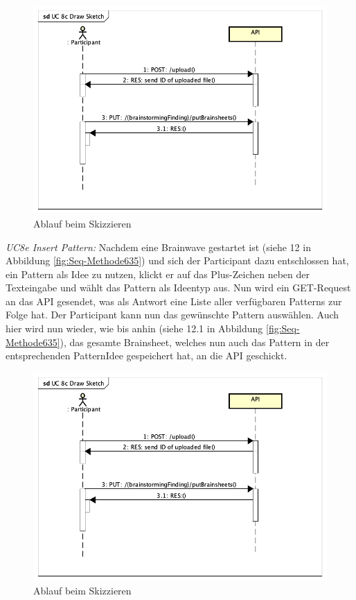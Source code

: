 \begin{figure}[h]
	\centering
	\includegraphics[width=1\linewidth]{img/anforderungen/Seq-Draw-Sketch}
	\caption[Ablauf beim Skizzieren]{Ablauf beim Skizzieren}
	\label{fig:Seq-Draw-Sketch}
\end{figure}

\begin{basedescript}{
		\desclabelstyle{\multilinelabel}
		\desclabelwidth{4.5cm}
		\setlength{\itemsep}{5ex}}	
	\item[\textit{UC8e Insert Pattern:}] Nachdem eine Brainwave gestartet ist (siehe 12 in Abbildung \ref{fig:Seq-Methode635}) und sich der Participant dazu entschlossen hat, ein Pattern als Idee zu nutzen, klickt er auf das Plus-Zeichen neben der Texteingabe und wählt das Pattern als Ideentyp aus. Nun wird ein GET-Request an das API gesendet, was als Antwort eine Liste aller verfügbaren Patterns zur Folge hat. Der Participant kann nun das gewünschte Pattern auswählen.
	Auch hier wird nun wieder, wie bis anhin (siehe 12.1 in Abbildung \ref{fig:Seq-Methode635}), das gesamte Brainsheet, welches nun auch das Pattern in der entsprechenden PatternIdee gespeichert hat, an die API geschickt.
\end{basedescript}


\begin{figure}[h]
	\centering
	\includegraphics[width=1\linewidth]{img/anforderungen/Seq-Draw-Sketch}
	\caption[Ablauf beim Skizzieren]{Ablauf beim Skizzieren}
	\label{fig:Seq-Draw-Sketch}
\end{figure}

